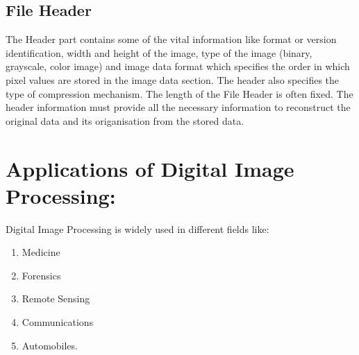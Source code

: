 \subsection{File Header}

The Header part contains some of the vital information like format or version identification, width and height of the image, type of the image (binary, grayscale, color image) and image data format which specifies the order in which pixel values are stored in the image data section.
The header also specifies the type of compression mechanism.
The length of the File Header is often fixed.
The header information must provide all the necessary information to reconstruct the original data and its origanisation from the stored data.

\section{Applications of Digital Image Processing:}
Digital Image Processing is widely used in different fields like:
\begin{enumerate}
    \item Medicine
    \item Forensics
    \item Remote Sensing
    \item Communications
    \item Automobiles.
\end{enumerate}